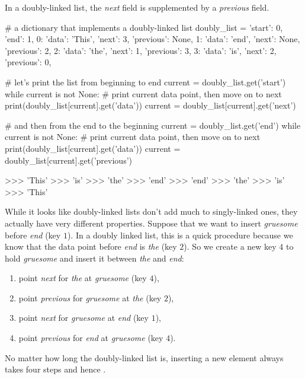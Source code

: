 \begin{programming}
In a doubly-linked list, the \emph{next} field is supplemented by a \emph{previous} field.
%
\begin{center}
\begin{pythoncode}
    # a dictionary that implements a doubly-linked list
    doubly_list = {
        'start': 0,
        'end': 1,
        0: {'data': 'This',
            'next': 3,
            'previous': None},
        1: {'data': 'end',
            'next': None,
            'previous': 2},
        2: {'data': 'the',
            'next': 1,
            'previous': 3},
        3: {'data': 'is',
            'next': 2,
            'previous': 0},
    }

    # let's print the list from beginning to end
    current = doubly_list.get('start')
    while current is not None:
        # print current data point, then move on to next
        print(doubly_list[current].get('data'))
        current = doubly_list[current].get('next')

    # and then from the end to the beginning
    current = doubly_list.get('end')
    while current is not None:
        # print current data point, then move on to next
        print(doubly_list[current].get('data'))
        current = doubly_list[current].get('previous')

    >>> 'This'
    >>> 'is'
    >>> 'the'
    >>> 'end'
    >>> 'end'
    >>> 'the'
    >>> 'is'
    >>> 'This'
\end{pythoncode}
\end{center}

While it looks like doubly-linked lists don't add much to singly-linked ones, they actually have very different properties.
Suppose that we want to insert \emph{gruesome} before \emph{end} (key $1$).
In a doubly linked list, this is a quick procedure because we know that the data point before \emph{end} is \emph{the} (key $2$).
So we create a new key $4$ to hold \emph{gruesome} and insert it between \emph{the} and \emph{end}:
%
\begin{enumerate}
    \item point \emph{next} for \emph{the} at \emph{gruesome} (key $4$), 
    \item point \emph{previous} for \emph{gruesome} at \emph{the} (key $2$),
    \item point \emph{next} for \emph{gruesome} at \emph{end} (key $1$),
    \item point \emph{previous} for \emph{end} at \emph{gruesome} (key $4$).
\end{enumerate}
%
No matter how long the doubly-linked list is, inserting a new element always takes four steps and hence .


\end{programming}
